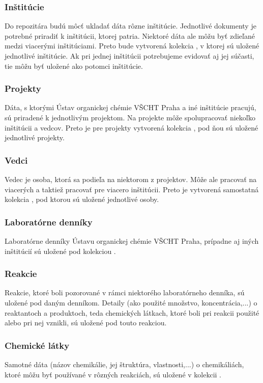 \documentclass[thesis=M,slovak]{FITthesis}[2013/05/06]
\begin{document}
\subsubsection{Inštitúcie}
Do repozitára budú môcť ukladať dáta rôzne inštitúcie. Jednotlivé dokumenty je potrebné priradiť k inštitúcii, ktorej patria. Niektoré dáta ale môžu byť zdieľané medzi viacerými inštitúciami. Preto bude vytvorená kolekcia , v ktorej sú uložené jednotlivé inštitúcie. Ak pri jednej inštitúcii potrebujeme evidovať aj jej súčasti, tie môžu byť uložené ako potomci inštitúcie.

\subsubsection{Projekty}
Dáta, s ktorými Ústav organickej chémie VŠCHT Praha a iné inštitúcie pracujú, sú priradené k jednotlivým projektom. Na projekte môže spolupracovať niekoľko inštitúcii a vedcov. Preto je pre projekty vytvorená kolekcia , pod ňou sú uložené jednotlivé projekty.

\subsubsection{Vedci}
Vedec je osoba, ktorá sa podieľa na niektorom z projektov. Môže ale pracovať na viacerých a taktiež pracovať pre viacero inštitúcii. Preto je vytvorená samostatná kolekcia , pod ktorou sú uložené jednotlivé osoby.

\subsubsection{Laboratórne denníky}
Laboratórne denníky Ústavu organickej chémie VŠCHT Praha, prípadne aj iných inštitúcií sú uložené pod kolekciou .

\subsubsection{Reakcie}
Reakcie, ktoré boli pozorované v rámci niektorého laboratórneho denníka, sú uložené pod daným denníkom. Detaily (ako použité množstvo, koncentrácia,...) o reaktantoch a produktoch, teda chemických látkach, ktoré boli pri reakcii použité alebo pri nej vznikli, sú uložené pod touto reakciou.

\subsubsection{Chemické látky}
Samotné dáta (názov chemikálie, jej štruktúra, vlastnosti,...) o chemikáliách, ktoré môžu byť používané v rôzných reakciách, sú uložené v kolekcii .
\end{document}
